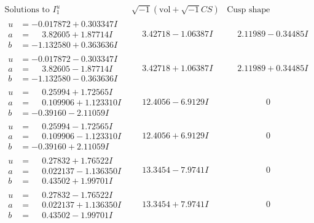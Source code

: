 \documentclass[1p]{elsarticle_modified}
\theoremstyle{definition}
\newcommand{\I}{\sqrt{-1}}
\begin{document}
$$\begin{array}{c|c|c}
\text{Solutions to }I^u_{1}& \I (\text{vol} + \sqrt{-1}CS) & \text{Cusp shape}\\
 \hline 
\begin{aligned}
u &= -0.017872 + 0.303347 I \\
a &= \phantom{-}3.82605 + 1.87714 I \\
b &= -1.132580 + 0.363636 I\end{aligned}
 & \phantom{-}3.42718 - 1.06387 I & \phantom{-}2.11989 - 0.34485 I \\ \hline\begin{aligned}
u &= -0.017872 - 0.303347 I \\
a &= \phantom{-}3.82605 - 1.87714 I \\
b &= -1.132580 - 0.363636 I\end{aligned}
 & \phantom{-}3.42718 + 1.06387 I & \phantom{-}2.11989 + 0.34485 I \\ \hline\begin{aligned}
u &= \phantom{-}0.25994 + 1.72565 I \\
a &= \phantom{-}0.109906 + 1.123310 I \\
b &= -0.39160 - 2.11059 I\end{aligned}
 & \phantom{-}12.4056 - 6.9129 I & \phantom{-0.000000 } 0 \\ \hline\begin{aligned}
u &= \phantom{-}0.25994 - 1.72565 I \\
a &= \phantom{-}0.109906 - 1.123310 I \\
b &= -0.39160 + 2.11059 I\end{aligned}
 & \phantom{-}12.4056 + 6.9129 I & \phantom{-0.000000 } 0 \\ \hline\begin{aligned}
u &= \phantom{-}0.27832 + 1.76522 I \\
a &= \phantom{-}0.022137 - 1.136350 I \\
b &= \phantom{-}0.43502 + 1.99701 I\end{aligned}
 & \phantom{-}13.3454 - 7.9741 I & \phantom{-0.000000 } 0 \\ \hline\begin{aligned}
u &= \phantom{-}0.27832 - 1.76522 I \\
a &= \phantom{-}0.022137 + 1.136350 I \\
b &= \phantom{-}0.43502 - 1.99701 I\end{aligned}
 & \phantom{-}13.3454 + 7.9741 I & \phantom{-0.000000 } 0 \\ \hline\begin{aligned}

\end{aligned}
\end{array}$$
\end{document}
